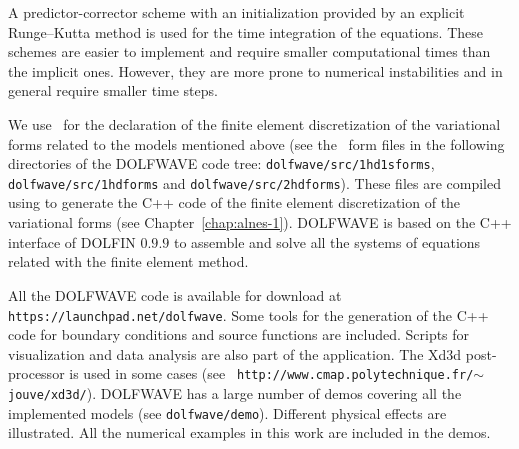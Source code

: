 A predictor-corrector scheme with an initialization
provided by an explicit Runge--Kutta method is used for the
time integration of the equations.
These schemes are easier to implement and require smaller
computational times than the implicit ones.
However, they are more prone to numerical instabilities
and in general require smaller time steps.

We use \ufl\ for the
declaration of the finite element discretization of the
variational forms related to the models mentioned above (see
the \ufl\ form files in the following directories of the
DOLFWAVE code tree: {\tt dolfwave/src/1hd1sforms}, {\tt
dolfwave/src/1hdforms} and {\tt dolfwave/src/2hdforms}).
These files are compiled using \ffc to generate the C++ code
of the finite element discretization of the variational
forms (see Chapter~\ref{chap:alnes-1}).  DOLFWAVE is based
on the C++ interface of DOLFIN $0.9.9$ to assemble and solve
all the systems of equations related with the finite element
method.

All the DOLFWAVE code is available for download at {\tt
https://launchpad.net/dolfwave}.  Some tools for the
generation of the C++ code for boundary conditions and
source functions are included. Scripts for visualization
and data analysis are also part of the application. The
Xd3d post-processor is used in some cases (see {\tt
http://www.cmap.polytechnique.fr/$\sim$jouve/xd3d/}).
DOLFWAVE has a large number of demos covering all the
implemented models (see {\tt dolfwave/demo}). Different
physical effects are illustrated.  All the numerical
examples in this work are included in the demos.

